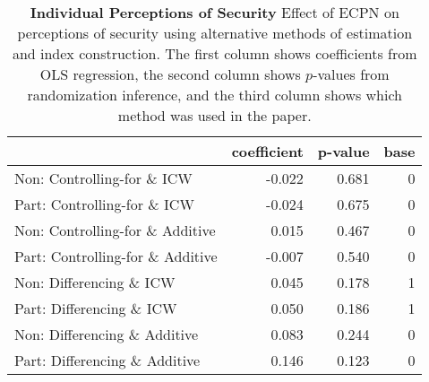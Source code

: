 \documentclass[
]{article}
\begin{document}
\begin{table}[H]
\begin{center}
\label{tab:security_tab_ind}
\caption{\textbf{Individual Perceptions of Security} Effect of ECPN on perceptions of security using alternative methods of estimation and index construction. The first column shows coefficients from OLS regression, the second column shows $p$-values from randomization inference, and the third column shows which method was used in the paper.}
\smallskip

\begin{tabular}{l|r|r|r}
\hline
  & coefficient & p-value & base\\
\hline
Non: Controlling-for \& ICW & -0.022 & 0.681 & 0\\
\hline
Part: Controlling-for \& ICW & -0.024 & 0.675 & 0\\
\hline
Non: Controlling-for \& Additive & 0.015 & 0.467 & 0\\
\hline
Part: Controlling-for \& Additive & -0.007 & 0.540 & 0\\
\hline
Non: Differencing \& ICW & 0.045 & 0.178 & 1\\
\hline
Part: Differencing \& ICW & 0.050 & 0.186 & 1\\
\hline
Non: Differencing \& Additive & 0.083 & 0.244 & 0\\
\hline
Part: Differencing \& Additive & 0.146 & 0.123 & 0\\
\hline
\end{tabular}


\end{center}
\end{table}
\end{document}
